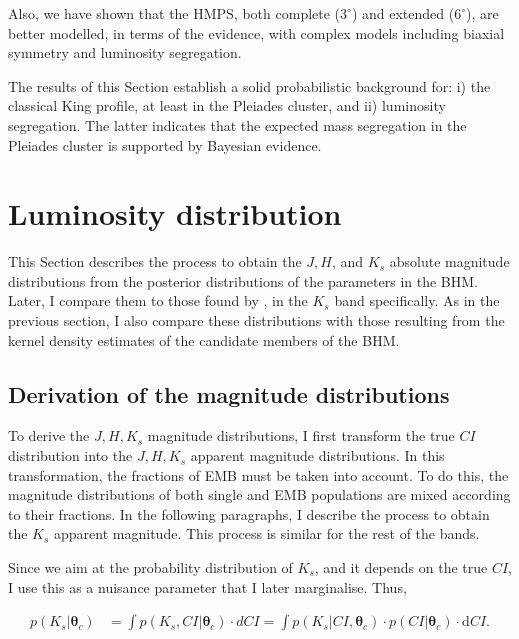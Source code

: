 Also, we have shown that the HMPS, both complete ($3^\circ$) and extended ($6^\circ$), are better modelled, in terms of the evidence, with complex models including biaxial symmetry and luminosity segregation.

The results of this Section establish a solid probabilistic background for: i) the classical King profile, at least in the Pleiades cluster, and ii) luminosity segregation. The latter indicates that the expected mass segregation in the Pleiades cluster \cite[as has been indicated by previous studies, e.g.][]{Converse2010} is supported by Bayesian evidence. 


\section{Luminosity distribution}
\label{sect:luminosity}
This Section describes the process to obtain the $J,H$, and $K_s$ absolute magnitude distributions from the posterior distributions of the parameters in the BHM. Later, I compare them to those found by \citet{Bouy2015}, in the $K_s$ band specifically. As in the previous section, I also compare these distributions with those resulting from the kernel density estimates of the candidate members of the BHM.

\subsection{Derivation of the magnitude distributions}
\label{subsect:deriveluminosity}
To derive the $J,H,K_s$ magnitude distributions, I first transform the true $CI$ distribution into the $J,H,K_s$ apparent magnitude distributions. In this transformation, the fractions of EMB must be taken into account. To do this, the magnitude distributions of both single and EMB populations are mixed according to their fractions. In the following paragraphs, I describe the process to obtain the $K_s$ apparent magnitude. This process is similar for the rest of the bands. 

Since we aim at the probability distribution of $K_s$, and it depends on the true $CI$, I use this as a nuisance parameter that I later marginalise. Thus, 

\begin{align}
p(K_s | \boldsymbol{\theta}_c) & = \int p(K_s,CI | \boldsymbol{\theta}_c) \cdot dCI =  \int p(K_s | CI ,\boldsymbol{\theta}_c) \cdot p(CI|\boldsymbol{\theta}_c)\cdot \mathrm{d}CI. \nonumber
\end{align}

